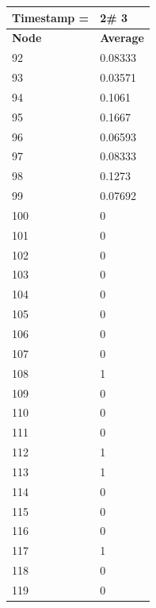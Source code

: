 \begin{tabular}{|l||l|}
\hline
\textbf{Timestamp =} & \textbf{2}\# 3\\\hline
	\textbf{Node} & \textbf{Average} \\ \hline
\hline
	92 & 0.08333 \\ \hline
	93 & 0.03571 \\ \hline
	94 & 0.1061 \\ \hline
	95 & 0.1667 \\ \hline
	96 & 0.06593 \\ \hline
	97 & 0.08333 \\ \hline
	98 & 0.1273 \\ \hline
	99 & 0.07692 \\ \hline
	100 & 0 \\ \hline
	101 & 0 \\ \hline
	102 & 0 \\ \hline
	103 & 0 \\ \hline
	104 & 0 \\ \hline
	105 & 0 \\ \hline
	106 & 0 \\ \hline
	107 & 0 \\ \hline
	108 & 1 \\ \hline
	109 & 0 \\ \hline
	110 & 0 \\ \hline
	111 & 0 \\ \hline
	112 & 1 \\ \hline
	113 & 1 \\ \hline
	114 & 0 \\ \hline
	115 & 0 \\ \hline
	116 & 0 \\ \hline
	117 & 1 \\ \hline
	118 & 0 \\ \hline
	119 & 0 \\ \hline
\end{tabular}

